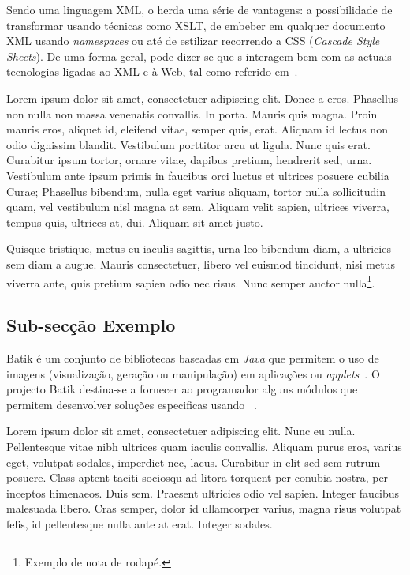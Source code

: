 Sendo uma linguagem XML, o \svg{} herda uma série de vantagens: a
possibilidade de transformar \svg{} usando técnicas como
XSLT, de embeber \svg{} em qualquer documento
XML usando \textit{namespaces} ou até de  
estilizar \svg{} recorrendo a CSS (\emph{Cascade Style Sheets}). 
De uma forma geral, pode dizer-se que \svg{}s interagem bem com as
actuais tecnologias ligadas ao XML e à Web, tal como referido
em~\citep{kn:svgibm,kn:svgw3c}.

Lorem ipsum dolor sit amet, consectetuer adipiscing elit. Donec a
eros. Phasellus non nulla non massa venenatis convallis. In
porta. Mauris quis magna. Proin mauris eros, aliquet id, eleifend
vitae, semper quis, erat. Aliquam id lectus non odio dignissim
blandit. Vestibulum porttitor arcu ut ligula. Nunc quis
erat. Curabitur ipsum tortor, ornare vitae, dapibus pretium, hendrerit
sed, urna. Vestibulum ante ipsum primis in faucibus orci luctus et
ultrices posuere cubilia Curae; Phasellus bibendum, nulla eget varius
aliquam, tortor nulla sollicitudin quam, vel vestibulum nisl magna at
sem. Aliquam velit sapien, ultrices viverra, tempus quis, ultrices at,
dui. Aliquam sit amet justo. 

Quisque tristique, metus eu iaculis
sagittis, urna leo bibendum diam, a ultricies sem diam a augue. Mauris
consectetuer, libero vel euismod tincidunt, nisi metus viverra ante,
quis pretium sapien odio nec risus. Nunc semper auctor
nulla\footnote{Exemplo de nota de rodapé.}. 

\subsection{Sub-secção Exemplo} \label{batik} 

Batik é um conjunto de bibliotecas baseadas em \textit{Java} que
permitem o uso de imagens \svg{} (visualização, geração ou
manipulação) em aplicações ou \textit{applets}~\citep{kn:batik}.  
O projecto Batik destina-se a fornecer ao programador
alguns módulos que permitem desenvolver soluções especificas usando
\svg~\citep{kn:svgdoc}. 

Lorem ipsum dolor sit amet, consectetuer adipiscing elit. Nunc eu
nulla. Pellentesque vitae nibh ultrices quam iaculis
convallis. Aliquam purus eros, varius eget, volutpat sodales,
imperdiet nec, lacus. Curabitur in elit sed sem rutrum posuere. Class
aptent taciti sociosqu ad litora torquent per conubia nostra, per
inceptos himenaeos. Duis sem. Praesent ultricies odio vel
sapien. Integer faucibus malesuada libero. Cras semper, dolor id
ullamcorper varius, magna risus volutpat felis, id pellentesque nulla
ante at erat. Integer sodales. 

